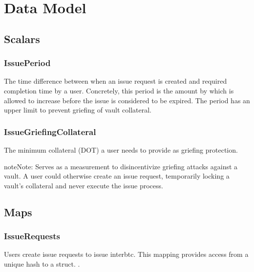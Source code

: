 \documentclass[a4paper,10pt,english]{sphinxmanual}
\begin{document}
\section{Data Model}
\label{\detokenize{spec/issue:data-model}}

\subsection{Scalars}
\label{\detokenize{spec/issue:scalars}}

\subsubsection{IssuePeriod}
\label{\detokenize{spec/issue:issueperiod}}
The time difference between when an issue request is created and required completion time by a user. Concretely, this period is the amount by which {\hyperref[\detokenize{spec/security:activeblockcount}]{}} is allowed to increase before the issue is considered to be expired. The period has an upper limit to prevent griefing of vault collateral.


\subsubsection{IssueGriefingCollateral}
\label{\detokenize{spec/issue:issuegriefingcollateral}}
The minimum collateral (DOT) a user needs to provide as griefing protection.

\begin{sphinxadmonition}{note}{Note:}
Serves as a measurement to disincentivize griefing attacks against a vault. A user could otherwise create an issue request, temporarily locking a vault’s collateral and never execute the issue process.
\end{sphinxadmonition}


\subsection{Maps}
\label{\detokenize{spec/issue:maps}}

\subsubsection{IssueRequests}
\label{\detokenize{spec/issue:issuerequests}}
Users create issue requests to issue interbtc. This mapping provides access from a unique hash  to a  struct. .
\end{document}
